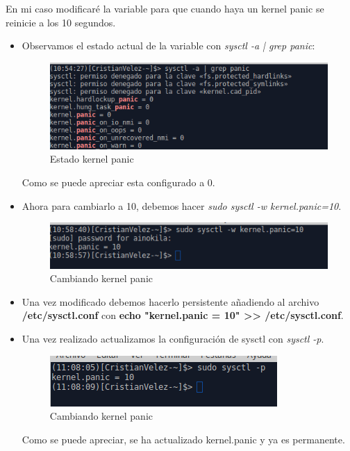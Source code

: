 En mi caso modificaré la variable para que cuando haya un kernel panic se reinicie a los 10 segundos.

\begin{itemize}
	\item Observamos el estado actual de la variable con \textit{sysctl -a | grep panic}:
	
	\begin{figure}[H] %
		\centering
		\includegraphics[scale=0.5]{pics/kernel}  %
		\caption{Estado kernel panic} \label{fig:kernel1}
	\end{figure}
	Como se puede apreciar esta configurado a 0.
	
	\item Ahora para cambiarlo a 10, debemos hacer \textit{sudo sysctl -w kernel.panic=10}.
	
	\begin{figure}[H] %
		\centering
		\includegraphics[scale=0.5]{pics/kernel1}  %
		\caption{Cambiando kernel panic} \label{fig:kernel2}
	\end{figure}

	\item Una vez modificado debemos hacerlo persistente añadiendo al archivo \textbf{/etc/sysctl.conf} con \textbf{echo "kernel.panic = 10" >> /etc/sysctl.conf}.

\item Una vez realizado actualizamos la configuración de sysctl con \textit{sysctl -p}.

\begin{figure}[H] %
	\centering
	\includegraphics[scale=0.5]{pics/kernel2}  %
	\caption{Cambiando kernel panic} \label{fig:kernel3}
\end{figure}

Como se puede apreciar, se ha actualizado kernel.panic y ya es permanente.
\end{itemize}
